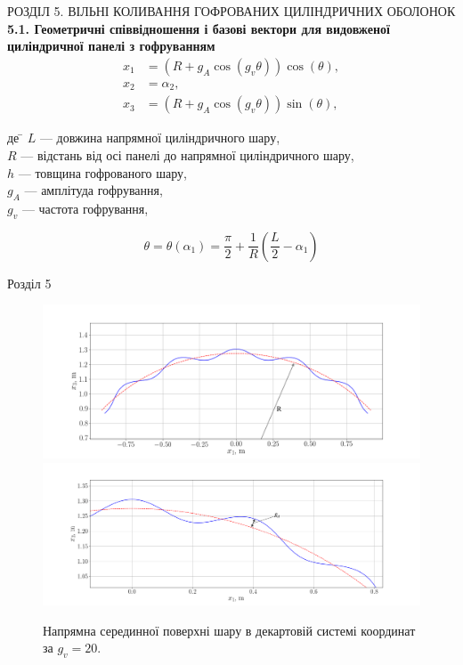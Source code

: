 \documentclass[8pt]{beamer}
\numberwithin{figure}{section}
\numberwithin{equation}{section}
\numberwithin{table}{section}
\begin{document}
\begin{frame}{РОЗДІЛ 5. ВІЛЬНІ КОЛИВАННЯ ГОФРОВАНИХ ЦИЛІНДРИЧНИХ ОБОЛОНОК}
\textbf{5.1. Геометричні співвідношення і базові вектори для видовженої циліндричної панелі з гофруванням}
\\
\vspace{1em}
\begin{equation}
\begin{aligned}
x_1&=\left(R + g_{A}\cos\left(g_v\theta\right) \right)\cos\left(\theta\right), \\
x_2&=\alpha_2,\\
x_3&=\left(R + g_{A}\cos\left(g_v\theta\right) \right)\sin\left(\theta\right), 
\end{aligned}
\end{equation}

\begin{tabbing}
де \= $L$ --- довжина напрямної циліндричного шару,\\
\> $R$ --- відстань від осі панелі до напрямної циліндричного шару,\\
\> $h$ --- товщина гофрованого шару,\\
\> $g_A$ --- амплітуда гофрування,\\
\> $g_v$ --- частота гофрування,\\
\end{tabbing}
\[
\theta=\theta\left(\alpha_1\right)=\frac{\pi}{2}+\frac{1}{R}\left(\frac{L}{2}-\alpha_1\right)\]


\end{frame}

\begin{frame}{Розділ 5}

\begin{figure}
	\includegraphics[width=0.8\linewidth]{pic/cor_geomR.png}\\
	\includegraphics[width=0.8\linewidth]{pic/cor_geom_zoomedR.png}
		\caption{Напрямна серединної поверхні шару в декартовій системі координат за $g_v=20$.}
		\label{fig:omage_K_h}
\end{figure}



\end{frame}
\end{document}
